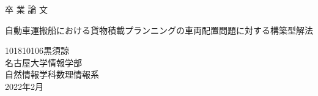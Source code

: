 \documentclass[platex]{jreport}
\begin{document}
\begin{table}[b]
\begin{center}
{\huge 卒\hspace{0.1cm} 業\hspace{0.1cm} 論\hspace{0.1cm} 文}\\[2.5cm]
\begin{spacing}{1.5}
	{\huge 自動車運搬船における貨物積載プランニングの車両配置問題に対する構築型解法}\\[6cm]
\end{spacing}
{\huge 101810106\qquad 黒須諒}\\[1cm]
{\huge 名古屋大学情報学部}\\[0.5cm]
{\huge 自然情報学科数理情報系}\\[0.5cm]
{\huge 2022年2月}\\
\end{center}
\end{table} 


\thispagestyle{empty} 
\clearpage
\newpage
{}
\setcounter{page}{1}



% 



\thispagestyle{empty} 
\tableofcontents
\newpage
\setcounter{page}{1}
\pagestyle{plain}







% 



\end{document}
